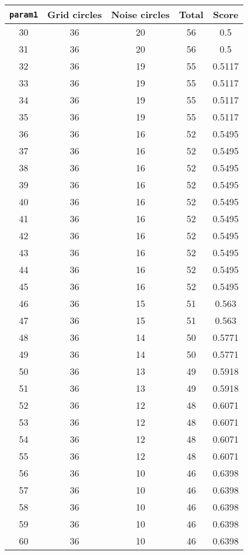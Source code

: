 \documentclass[letterpaper, 12pt]{article}
\begin{document}
\begin{longtable}{|c|c|c|c|c|}
\hline
\textbf{\texttt{param1}} & \textbf{Grid circles} & \textbf{Noise circles} & \textbf{Total} & \textbf{Score} \\
\hline
30 & 36 & 20 & 56 & 0.5 \\
\hline
31 & 36 & 20 & 56 & 0.5 \\
\hline
32 & 36 & 19 & 55 & 0.5117 \\
\hline
33 & 36 & 19 & 55 & 0.5117 \\
\hline
34 & 36 & 19 & 55 & 0.5117 \\
\hline
35 & 36 & 19 & 55 & 0.5117 \\
\hline
36 & 36 & 16 & 52 & 0.5495 \\
\hline
37 & 36 & 16 & 52 & 0.5495 \\
\hline
38 & 36 & 16 & 52 & 0.5495 \\
\hline
39 & 36 & 16 & 52 & 0.5495 \\
\hline
40 & 36 & 16 & 52 & 0.5495 \\
\hline
41 & 36 & 16 & 52 & 0.5495 \\
\hline
42 & 36 & 16 & 52 & 0.5495 \\
\hline
43 & 36 & 16 & 52 & 0.5495 \\
\hline
44 & 36 & 16 & 52 & 0.5495 \\
\hline
45 & 36 & 16 & 52 & 0.5495 \\
\hline
46 & 36 & 15 & 51 & 0.563 \\
\hline
47 & 36 & 15 & 51 & 0.563 \\
\hline
48 & 36 & 14 & 50 & 0.5771 \\
\hline
49 & 36 & 14 & 50 & 0.5771 \\
\hline
50 & 36 & 13 & 49 & 0.5918 \\
\hline
51 & 36 & 13 & 49 & 0.5918 \\
\hline
52 & 36 & 12 & 48 & 0.6071 \\
\hline
53 & 36 & 12 & 48 & 0.6071 \\
\hline
54 & 36 & 12 & 48 & 0.6071 \\
\hline
55 & 36 & 12 & 48 & 0.6071 \\
\hline
56 & 36 & 10 & 46 & 0.6398 \\
\hline
57 & 36 & 10 & 46 & 0.6398 \\
\hline
58 & 36 & 10 & 46 & 0.6398 \\
\hline
59 & 36 & 10 & 46 & 0.6398 \\
\hline
60 & 36 & 10 & 46 & 0.6398 \\

\end{longtable}
\end{document}
